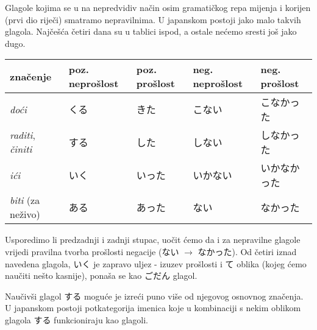 \newpage
{}

	
	
	Glagole kojima se u na nepredvidiv način osim gramatičkog repa mijenja i korijen (prvi dio riječi) smatramo nepravilnima. U japanskom postoji jako malo takvih glagola. Najčešća četiri dana su u tablici ispod, a ostale nećemo sresti još jako dugo.
	
	\begin{table}[h]
		\centering
		\begin{tabular}{l l l l l}\toprule[2pt]
			značenje & poz. neprošlost & poz. prošlost & neg. neprošlost & neg. prošlost\\
			\midrule
			\textit{doći} & くる & きた & こない & こなかった\\
			\textit{raditi}, \textit{činiti} & する & した & しない & しなかった\\
			\textit{ići} & いく & いった & いかない & いかなかった\\
			\textit{biti} (za neživo) & ある & あった & ない & なかった\\
			\bottomrule[2pt]
		\end{tabular}
	\end{table}

	Usporedimo li predzadnji i zadnji stupac, uočit ćemo da i za nepravilne glagole vrijedi pravilna tvorba prošlosti negacije (ない $\rightarrow$ なかった). Od četiri iznad navedena glagola, いく je zapravo uljez - izuzev prošlosti i て oblika (kojeg ćemo naučiti nešto kasnije), ponaša se kao ごだん glagol.
	
	
	Naučivši glagol する moguće je izreći puno više od njegovog osnovnog značenja. U japanskom postoji potkategorija imenica koje u kombinaciji s nekim oblikom glagola する funkcioniraju kao glagoli.
	
	\begin{reibun}
	\end{reibun}
	
